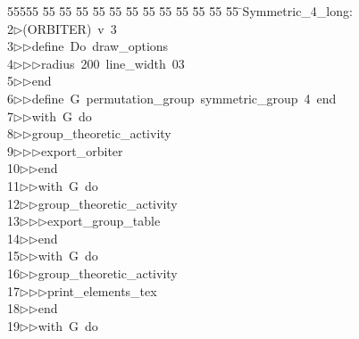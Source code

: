 %
%
\begin{tabbing}
55555 \= 55 \= 55 \= 55 \= 55 \= 55 \= 55 \= 55 \= 55 \= 55 \= 55 \= 55 \= 55 \= \>Symmetric\_4\_long:\\[0pt]
2\>$\triangleright$\>(ORBITER)\ v\ 3\ \\[0pt]
3\>$\triangleright$\>$\triangleright$\>define\ Do\ draw\_options\ \\[0pt]
4\>$\triangleright$\>$\triangleright$\>$\triangleright$\>radius\ 200\ line\_width\ 03\ \\[0pt]
5\>$\triangleright$\>$\triangleright$\>end\ \\[0pt]
6\>$\triangleright$\>$\triangleright$\>define\ G\ permutation\_group\ symmetric\_group\ 4\ end\ \\[0pt]
7\>$\triangleright$\>$\triangleright$\>with\ G\ do\ \\[0pt]
8\>$\triangleright$\>$\triangleright$\>group\_theoretic\_activity\ \\[0pt]
9\>$\triangleright$\>$\triangleright$\>$\triangleright$\>export\_orbiter\ \\[0pt]
10\>$\triangleright$\>$\triangleright$\>end\ \\[0pt]
11\>$\triangleright$\>$\triangleright$\>with\ G\ do\ \\[0pt]
12\>$\triangleright$\>$\triangleright$\>group\_theoretic\_activity\ \\[0pt]
13\>$\triangleright$\>$\triangleright$\>$\triangleright$\>export\_group\_table\ \\[0pt]
14\>$\triangleright$\>$\triangleright$\>end\ \\[0pt]
15\>$\triangleright$\>$\triangleright$\>with\ G\ do\ \\[0pt]
16\>$\triangleright$\>$\triangleright$\>group\_theoretic\_activity\ \\[0pt]
17\>$\triangleright$\>$\triangleright$\>$\triangleright$\>print\_elements\_tex\ \\[0pt]
18\>$\triangleright$\>$\triangleright$\>end\ \\[0pt]
19\>$\triangleright$\>$\triangleright$\>with\ G\ do\ \\[0pt]

\end{tabbing}
